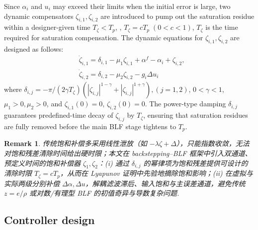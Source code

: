 \documentclass[pdflatex,sn-mathphys-num]{sn-jnl}%
\theoremstyle{thmstyleone}%
\theoremstyle{thmstyletwo}%
\newtheorem{remark}{Remark}%
\theoremstyle{thmstylethree}%
\begin{document}
Since \(\alpha_i\) and \(u_i\) may exceed their
limits when the initial error is large, two dynamic compensators
\(\zeta_{i,1},\zeta_{i,2}\) are introduced to pump out the
saturation residue within a designer-given time $T_{\zeta}< T_{p}$, , $T_{\zeta}=c T_{p}\;(0<c <1)$, $T_{\zeta}$ is the time required for saturation compensation. The dynamic equations for \(\zeta_{i,1},\zeta_{i,2}\) are designed as follows:
\begin{subequations}\label{eq:24}
	\begin{align}
		& \dot\zeta_{i,1}\!
	  = \delta_{i,1}-\mu_1 \zeta_{i,1}
		 + \alpha^{f}-\alpha_i+\zeta_{i,2}, \\
	  &\dot\zeta_{i,2}\!=\delta_{i,2}-\mu_2 \zeta_{i,2}- {g_i}{\Delta u_i}
	\end{align}
	\end{subequations}
where $\delta_{i,j} =-{\pi}/({2\gamma T_{\zeta}})(|\zeta_{i,j}|^{1-\gamma}
+|\zeta_{i,j}|^{1+\gamma}), (j=1,2)$, \(0<\gamma<1\), $\mu_1>0, \mu_2>0$, and $\zeta_{i,1}(0)=0$, $\zeta_{i,2}(0)=0$. The power-type damping $\delta_{i,j}$ guarantees predefined-time decay of $\zeta_{i,j}$ by $T_{\zeta}$, ensuring that saturation residues are fully removed before the main BLF stage tightens to $T_p$.

\begin{remark}
	传统饱和补偿多采用线性泄放（如 $-\lambda\zeta+\Delta$），只能指数收敛，无法对饱和残差清除时间给出硬时限；本文在 backstepping–BLF 框架中引入双通道、预定义时间的饱和补偿器 $\zeta_{1},\zeta_{2}$：(i) 通过 $\delta_{i,j}$ 的幂律项为饱和残差提供可设计的清除时限 $T_{\zeta}=cT_p$，从而在 Lyapunov 证明中先验地摘除饱和影响；(ii) 在虚拟与实际两级分别补偿 $\Delta\alpha,\Delta u$，解耦滤波滞后、输入饱和与主误差通道，避免传统 $z=e/\rho$ 或对数/有理型 BLF 的初值奇异与导数复杂问题.
	\end{remark}

\subsection{Controller design}
\end{document}

